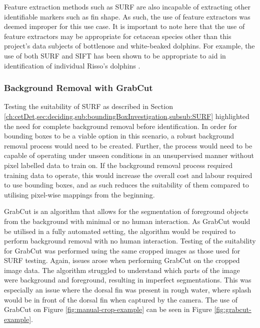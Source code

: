 Feature extraction methods such as SURF are also incapable of extracting other identifiable markers such as fin shape. As such, the use of feature extractors was deemed improper for this use case. It is important to note here that the use of feature extractors may be appropriate for cetacean species other than this project's data subjects of bottlenose and white-beaked dolphins. For example, the use of both SURF and SIFT has been shown to be appropriate to aid in identification of individual Risso's dolphins \cite{reno_sift-based_2019, maglietta_dolfin_2018}.

\subsubsection{Background Removal with GrabCut}\label{ch:cetDet,sec:deciding,sub:boundingBoxInvestigation,subsub:GrabCut}

Testing the suitability of SURF as described in Section \ref{ch:cetDet,sec:deciding,sub:boundingBoxInvestigation,subsub:SURF} highlighted the need for complete background removal before identification. In order for bounding boxes to be a viable option in this scenario, a robust background removal process would need to be created. Further, the process would need to be capable of operating under unseen conditions in an unsupervised manner without pixel labelled data to train on. If the background removal process required training data to operate, this would increase the overall cost and labour required to use bounding boxes, and as such reduces the suitability of them compared to utilising pixel-wise mappings from the beginning.

GrabCut \cite{rother_grabcut_2004} is an algorithm that allows for the segmentation of foreground objects from the background with minimal or no human interaction. As GrabCut would be utilised in a fully automated setting, the algorithm would be required to perform background removal with no human interaction. Testing of the suitability for GrabCut was performed using the same cropped images as those used for SURF testing. Again, issues arose when performing GrabCut on the cropped image data. The algorithm struggled to understand which parts of the image were background and foreground, resulting in imperfect segmentations. This was especially an issue where the dorsal fin was present in rough water, where splash would be in front of the dorsal fin when captured by the camera. The use of GrabCut on Figure \ref{fig:manual-crop-example} can be seen in Figure \ref{fig:grabcut-example}.

